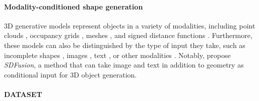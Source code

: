 \paragraph{Modality-conditioned shape generation}
3D generative models represent objects in a variety of modalities, including point clouds \citep{achlioptas2018learning, luo2021diffusion}, occupancy grids \citep{mescheder2019occupancy}, meshes \citep{mo2019structurenet}, and signed distance functions \citep{park2019deepsdf}.
Furthermore, these models can also be distinguished by the type of input they take, such as incomplete shapes \citep{dai2017shape}, images \citep{fan2017point}, text \citep{liu2022towards, zhao2023michelangelo}, or other modalities \citep{Zhou_2021_CVPR}. 
Notably, \citet{cheng2023sdfusion} propose \emph{SDFusion}, a method that can take image and text in addition to geometry as conditional input for 3D object generation.

\paragraph{DATASET}